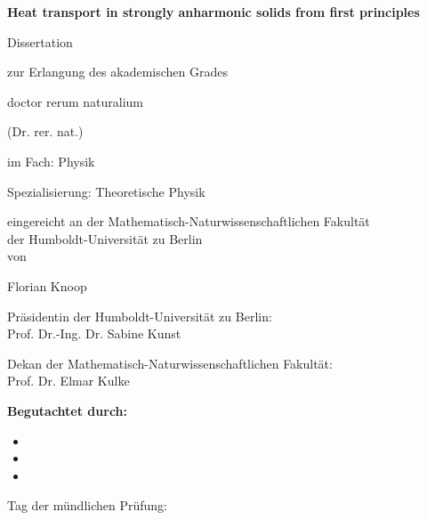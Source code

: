 \thispagestyle{empty}

\begin{fullwidth}
  \begin{center}
  \LARGE
  \textbf{Heat transport in strongly anharmonic solids from first principles}
  \\ \vspace{3em}
  
  \Large
  Dissertation 
  
  zur Erlangung des akademischen Grades 
  
  doctor rerum naturalium
  
  (Dr. rer. nat.)
  
  \vspace{3em}
    
  im Fach: Physik

Spezialisierung: Theoretische Physik 

\vspace{3em}

eingereicht an der Mathematisch-Naturwissenschaftlichen Fakultät \\
der Humboldt-Universität zu Berlin \\
von 

\vspace{3em} 

Florian Knoop 

\vspace{3em}

Präsidentin der Humboldt-Universität zu Berlin: \\ Prof. Dr.-Ing. Dr. Sabine Kunst 

\vspace{3em}

Dekan der Mathematisch-Naturwissenschaftlichen Fakultät: \\ Prof. Dr. Elmar Kulke

\vspace{3em}

\vfill
\textbf{Begutachtet durch:}

\vspace{2em}

\begin{itemize}
  \setlength\itemsep{1em}
  \item 
  \item 
  \item 
\end{itemize}

\vspace{3em}	

\flushleft Tag der mündlichen Prüfung:

\end{center}
\end{fullwidth}
